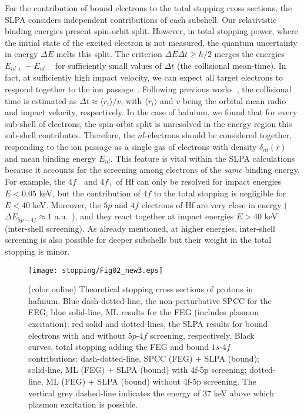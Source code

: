 For the contribution of bound electrons to the total stopping cross 
sections, the SLPA considers independent contributions of each subshell. 
Our relativistic binding energies present spin-orbit split. However, 
in total stopping power, where the initial state of the excited electron 
is not measured, the quantum uncertainty in energy $\Delta E$ melts this 
split. The criterion $\Delta E\Delta t\geq\hbar/2$ merges the energies 
$E_{nl+}-E_{nl-}$ for sufficiently small values of $\Delta t$ (the 
collisional mean-time). In fact, at sufficiently high impact velocity, 
we can expect all target electrons to respond together to the ion 
passage~\cite{lindhard53,chu72}. Following previous works~\cite{mon09},
the collisional time is estimated as $\Delta t\approx\langle r_i\rangle/v$, 
with $\langle r_i\rangle$ and $v$ being the orbital mean radio and 
impact velocity, respectively. In the case of hafnium, we found that for 
every sub-shell of electrons, the spin-orbit split is unresolved in the 
energy region this sub-shell contributes. Therefore, the $nl$-electrons 
should be considered together, responding to the ion passage as a single 
gas of electrons with density $\delta_{nl}(r)$ and mean binding energy 
$E_{nl}$. This feature is vital within the SLPA calculations because 
it accounts for the screening among electrons of the \textit{same} 
binding energy. For example, the $4f_{-}$ and $4f_{+}$ of Hf can only 
be resolved for impact energies $E<0.05$ keV, but the contribution of 
$4f$ to the total stopping is negligible for $E<40$ keV. Moreover, the 
$5p$ and $4f$ electrons of Hf are very close in energy 
($\Delta E_{5p-4f} \approx 1$ a.u.~\cite{mendez2019}), and they react 
together at impact energies $E>40$ keV (inter-shell screening). As 
already mentioned, at higher energies, inter-shell screening is also possible 
for deeper subshells %
but their weight in the total stopping is minor.

\begin{figure*}[!t]
\centering
\texttt{[image: stopping/Fig02\_new3.eps]}
\caption{(color online) Theoretical stopping cross sections of protons 
in hafnium. 
Blue dash-dotted-line, the non-perturbative SPCC for the FEG; 
blue solid-line, ML results for the FEG (includes plasmon excitation); 
red solid and dotted-lines, the SLPA results for bound electrons with 
and without $5p$-$4f$ screening, respectively. 
Black curves, total stopping adding the FEG and bound $1s$-$4f$ 
contributions: 
dash-dotted-line, SPCC (FEG) + SLPA (bound); 
solid-line, ML (FEG) + SLPA (bound) with 4f-5p screening; 
dotted-line, ML (FEG) + SLPA (bound) without 4f-5p screening.
The vertical grey dashed-line indicates the energy of 37 keV
above which plasmon excitation is possible.} 
\label{slpa4f}
\end{figure*}

